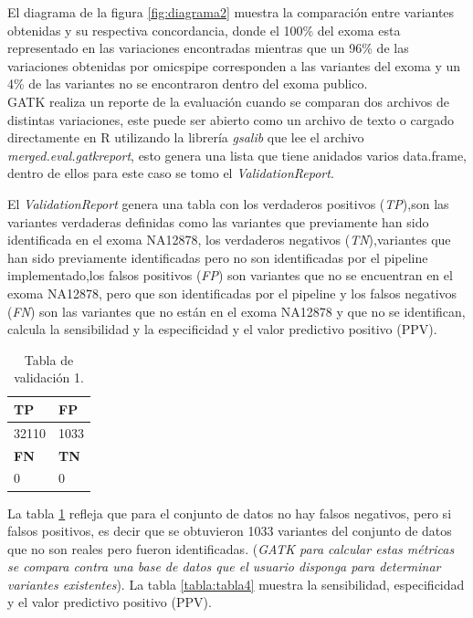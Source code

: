 El diagrama de la figura \ref{fig:diagrama2} muestra la comparación entre variantes obtenidas y su respectiva concordancia, donde el 100\% del exoma esta representado en las variaciones encontradas mientras que un 96\% de las variaciones obtenidas por omicspipe corresponden a las variantes del exoma y un 4\% de las variantes no se encontraron dentro del exoma publico. \\

GATK realiza un reporte de la evaluación cuando se comparan dos archivos de distintas variaciones, este puede ser abierto como un archivo de texto o cargado directamente en R utilizando la librería \textit{gsalib} que lee el archivo \textit{merged.eval.gatkreport}, esto genera una lista que tiene anidados varios data.frame, dentro de ellos para este caso se tomo el \textit{ValidationReport}.

El \textit{ValidationReport}  genera una tabla con los verdaderos positivos (\textit{TP}),son las variantes verdaderas definidas como las variantes que previamente han sido identificada en el exoma NA12878, los verdaderos negativos (\textit{TN}),variantes que han sido previamente identificadas pero no son identificadas por el pipeline implementado,los falsos positivos (\textit{FP}) son variantes que no se encuentran en el exoma NA12878, pero que son identificadas por el pipeline y los falsos negativos (\textit{FN})  son las variantes que no están en el exoma NA12878 y que no se identifican, calcula la sensibilidad y la especificidad  y el valor predictivo positivo (PPV). 

\begin{table}[H]
	\begin{center}
		\begin{tabular}{|l|l|}
			\hline 
			\textbf{TP} &  \textbf{FP} \\
			\hline 
			32110 & 1033  \\ \hline
			\textbf{FN} &  \textbf{TN} \\
			\hline
			0 &  0\\ \hline
		\end{tabular}
		\caption{Tabla de validación 1.}
		\label{tabla:tabla3}
	\end{center}
\end{table}

La tabla \ref{tabla:tabla3} refleja que para el conjunto de datos no hay falsos negativos, pero si falsos positivos, es decir  que se obtuvieron 1033 variantes del conjunto de datos que no son reales pero fueron identificadas. (\textit{GATK para calcular estas métricas se compara contra una base de datos que el usuario disponga para determinar variantes existentes}).  La tabla \ref{tabla:tabla4} muestra la sensibilidad, especificidad y el valor predictivo positivo (PPV).

